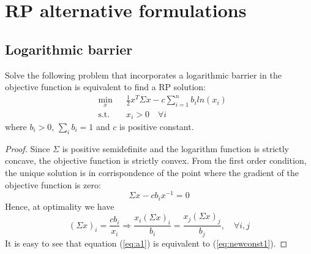 \section{RP alternative formulations}
\subsection{Logarithmic barrier}
\begin{theorem}
Solve the following problem that incorporates a logarithmic barrier in the objective function is equivalent to find a RP solution:
\begin{equation}\label{eq:log1}
\begin{aligned}
& \underset{x}{\text{min}}
&&\frac{1}{2} x^T \Sigma x - c \sum_{i=1}^{n} b_i ln(x_i)\\
& \text{s.t.}
&& x_i > 0 \hspace{1em} \forall i
\end{aligned}
\end{equation}
where $b_i > 0$, $\sum_i b_i = 1$ and $c$ is positive constant.
\end{theorem}
\begin{proof}
Since $\Sigma$ is positive semidefinite and the logarithm function is strictly concave, the objective function is strictly convex. From the first order condition, the unique solution is in corrispondence of the point where the gradient of the objective function is zero:
\begin{equation}
\Sigma x - c b_i x^{-1} = 0
\end{equation}
Hence, at optimality we have
\begin{equation}\label{eq:a1}
(\Sigma x)_i = \frac{c b_i}{x_i} \Rightarrow \frac{x_i(\Sigma x)_i}{b_i} = \frac{x_j(\Sigma x)_j}{b_j}, \quad \forall i,j
\end{equation}
It is easy to see that equation (\ref{eq:a1}) is equivalent to (\ref{eq:newconst1}). 
\end{proof}
